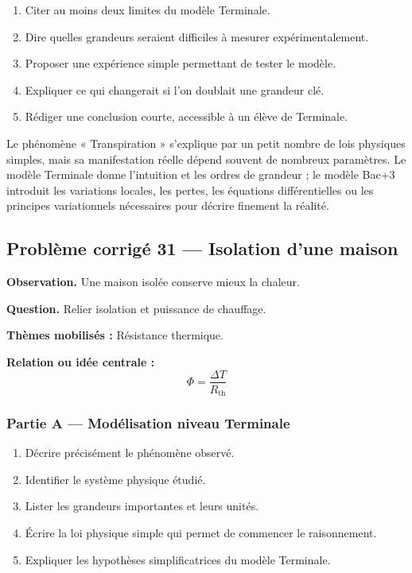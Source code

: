 \documentclass[11pt,a4paper]{article}
\begin{document}
\begin{enumerate}
  \item Citer au moins deux limites du modèle Terminale.
  \item Dire quelles grandeurs seraient difficiles à mesurer expérimentalement.
  \item Proposer une expérience simple permettant de tester le modèle.
  \item Expliquer ce qui changerait si l'on doublait une grandeur clé.
  \item Rédiger une conclusion courte, accessible à un élève de Terminale.
\end{enumerate}

\begin{corrigebox}
Le phénomène « Transpiration » s'explique par un petit nombre de lois physiques simples, mais sa manifestation réelle dépend souvent de nombreux paramètres. Le modèle Terminale donne l'intuition et les ordres de grandeur ; le modèle Bac+3 introduit les variations locales, les pertes, les équations différentielles ou les principes variationnels nécessaires pour décrire finement la réalité.
\end{corrigebox}

\subsection{Problème corrigé 31 — Isolation d'une maison}

\begin{exercicebox}
\textbf{Observation.} Une maison isolée conserve mieux la chaleur.

\medskip
\textbf{Question.} Relier isolation et puissance de chauffage.

\medskip
\textbf{Thèmes mobilisés :} Résistance thermique.

\medskip
\textbf{Relation ou idée centrale :}
\[
\Phi=\frac{\Delta T}{R_{\mathrm{th}}}
\]
\end{exercicebox}

\subsubsection*{Partie A — Modélisation niveau Terminale}

\begin{enumerate}
  \item Décrire précisément le phénomène observé.
  \item Identifier le système physique étudié.
  \item Lister les grandeurs importantes et leurs unités.
  \item Écrire la loi physique simple qui permet de commencer le raisonnement.
  \item Expliquer les hypothèses simplificatrices du modèle Terminale.
\end{enumerate}
\end{document}
